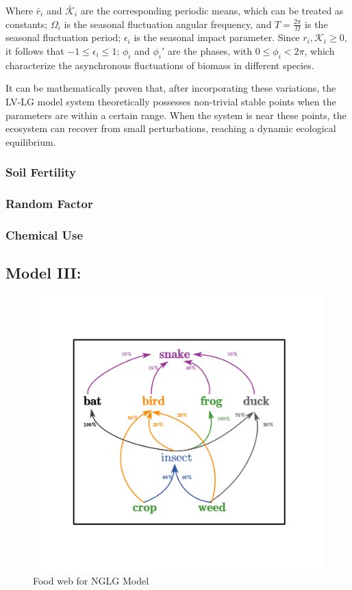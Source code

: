 \documentclass{HZNUMCM}
\begin{document}
          Where $\bar{r}_i$ and $\bar{\mathscr{K}}_i$ are the corresponding periodic means, 
          which can be treated as constants; $\Omega_i$ is the seasonal fluctuation angular frequency, 
          and $T = \frac{2\pi}{\Omega}$ is the seasonal fluctuation period; 
          $\epsilon_i$ is the seasonal impact parameter. Since $r_i, \mathscr{K}_i \geqslant 0$, 
          it follows that $-1 \leqslant \epsilon_i \leqslant 1$; $\phi_i$ and $\phi_i'$ are the phases, 
          with $0 \leqslant \phi_i < 2\pi$, which characterize the asynchronous fluctuations of biomass in different species.
          
          It can be mathematically proven that, after incorporating these variations, 
          the LV-LG model system theoretically possesses non-trivial stable points when the parameters are within a certain range. 
          When the system is near these points, the ecosystem can recover from small perturbations, 
          reaching a dynamic ecological equilibrium.

        \subsubsection{Soil Fertility}
        \subsubsection{Random Factor}
        \subsubsection{Chemical Use}
      \subsection{Model III: }
        \begin{figure}[H]
          \centering
          \includegraphics[width=0.5\linewidth]{images/food_web.pdf}
          \caption{Food web for NGLG Model}
          \label{fig:NGLG_FoodWeb}
        \end{figure}
\end{document}
